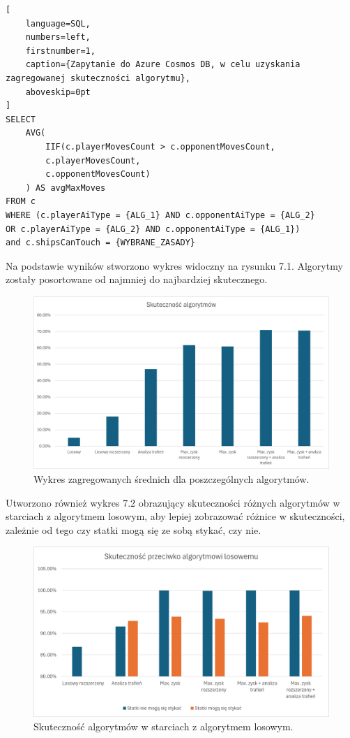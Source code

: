 \begin{addmargin}[10mm]{0mm}
\begin{lstlisting}[
    language=SQL,
    numbers=left,
    firstnumber=1,
    caption={Zapytanie do Azure Cosmos DB, w celu uzyskania zagregowanej skuteczności algorytmu},
    aboveskip=0pt
]
SELECT 
    AVG(
        IIF(c.playerMovesCount > c.opponentMovesCount,
        c.playerMovesCount,
        c.opponentMovesCount)
    ) AS avgMaxMoves
FROM c
WHERE (c.playerAiType = {ALG_1} AND c.opponentAiType = {ALG_2}
OR c.playerAiType = {ALG_2} AND c.opponentAiType = {ALG_1})
and c.shipsCanTouch = {WYBRANE_ZASADY}
\end{lstlisting}
\end{addmargin}

Na podstawie wyników stworzono wykres widoczny na rysunku 7.1. Algorytmy zostały posortowane od najmniej do najbardziej skutecznego.

\begin{figure}[!h]
    \label{fig:aggregate-chart}
    \centering \includegraphics[width=0.9\linewidth]{img/aggregate-chart.png}
    \caption{Wykres zagregowanych średnich dla poszczególnych algorytmów.}
\end{figure}

Utworzono również wykres 7.2 obrazujący skuteczności różnych algorytmów w starciach z algorytmem losowym, aby lepiej zobrazować różnice w skuteczności, zależnie od tego czy statki mogą się ze sobą stykać, czy nie.

\begin{figure}[!h]
    \label{fig:round-avg}
    \centering \includegraphics[width=0.9\linewidth]{img/chart-random-scores.png}
    \caption{Skuteczność algorytmów w starciach z algorytmem losowym.}
\end{figure}

